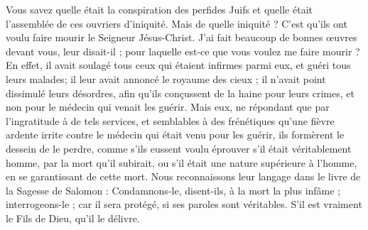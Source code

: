 Vous savez quelle était la conspiration des perfides Juifs et quelle était l’assemblée de ces ouvriers d’iniquité. Mais de quelle iniquité ? C’est qu’ils ont voulu faire mourir le Seigneur Jésus-Christ. J’ai fait beaucoup de bonnes œuvres devant vous, leur disait-il ; pour laquelle est-ce que vous voulez me faire mourir ? En effet, il avait soulagé tous ceux qui étaient infirmes parmi eux, et guéri tous leurs malades; il leur avait annoncé le royaume des cieux ; il n’avait point dissimulé leurs désordres, afin qu’ils conçussent de la haine pour leurs crimes, et non pour le médecin qui venait les guérir. Mais eux, ne répondant que par l’ingratitude à de tels services, et semblables à des frénétiques qu’une fièvre ardente irrite contre le médecin qui était venu pour les guérir, ils formèrent le dessein de le perdre, comme s’ils eussent voulu éprouver s’il était véritablement homme, par la mort qu’il subirait, ou s’il était une nature supérieure à l’homme, en se garantissant de cette mort. Nous reconnaissons leur langage dans le livre de la Sagesse de Salomon : Condamnons-le, disent-ils, à la mort la plus infâme ; interrogeons-le ; car il sera protégé, si ses paroles sont véritables. S’il est vraiment le Fils de Dieu, qu’il le délivre.